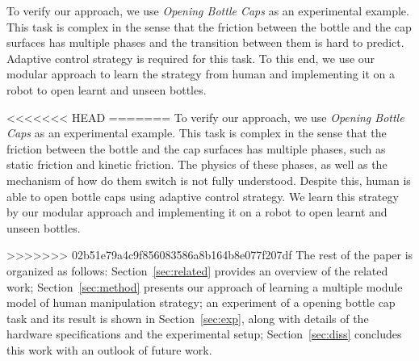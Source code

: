 To verify our approach, we use \emph{Opening Bottle Caps} as an experimental example. This task is complex in the sense that the friction between the bottle and the cap surfaces has multiple phases and the transition between them is hard to predict. Adaptive control strategy is required for this task. To this end, we use our modular approach to learn the strategy from human and implementing it on a robot to open learnt and unseen bottles.

<<<<<<< HEAD
=======
To verify our approach, we use \emph{Opening Bottle Caps} as an experimental example. This task is complex in the sense that the friction between the bottle and the cap surfaces has multiple phases, such as static friction and kinetic friction. The physics of these phases, as well as the mechanism of how do them switch is not fully understood. Despite this, human is able to open bottle caps using adaptive control strategy. We learn this strategy by our modular approach and implementing it on a robot to open learnt and unseen bottles.


>>>>>>> 02b51e79a4c9f856083586a8b164b8e077f207df
The rest of the paper is organized as follows: Section~\ref{sec:related} provides an overview of the related work; Section~\ref{sec:method} presents our approach of learning a multiple module model of human manipulation strategy; an experiment of a opening bottle cap task and its result is shown in Section~\ref{sec:exp}, along with details of the hardware specifications and the experimental setup; Section~\ref{sec:diss} concludes this work with an outlook of future work. 